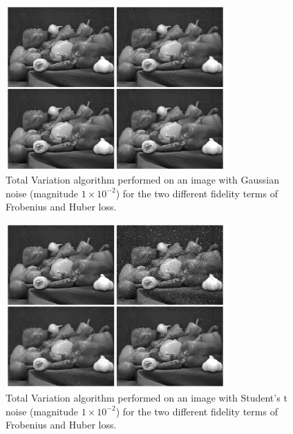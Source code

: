 \documentclass[10pt,a4paper]{article}
\begin{document}
	\begin{figure}[H]
		\begin{center}
			\includegraphics[width = 0.75\textwidth]{../figures/gaussian_peppers.png} 
		\end{center}
		\caption{Total Variation algorithm performed on an image with Gaussian noise (magnitude $1 \times 10^{-2}$) for the two different fidelity terms of Frobenius and Huber loss.}
		\label{tv_gauss}
	\end{figure}
	
	\begin{figure}[H]
		\begin{center}
			\includegraphics[width = 0.75\textwidth]{../figures/student-t_peppers.png} 
		\end{center}
		\caption{Total Variation algorithm performed on an image with Student's t noise (magnitude $1 \times 10^{-2}$) for the two different fidelity terms of Frobenius and Huber loss.}
		\label{tv_student}
	\end{figure}
	
\end{document}
